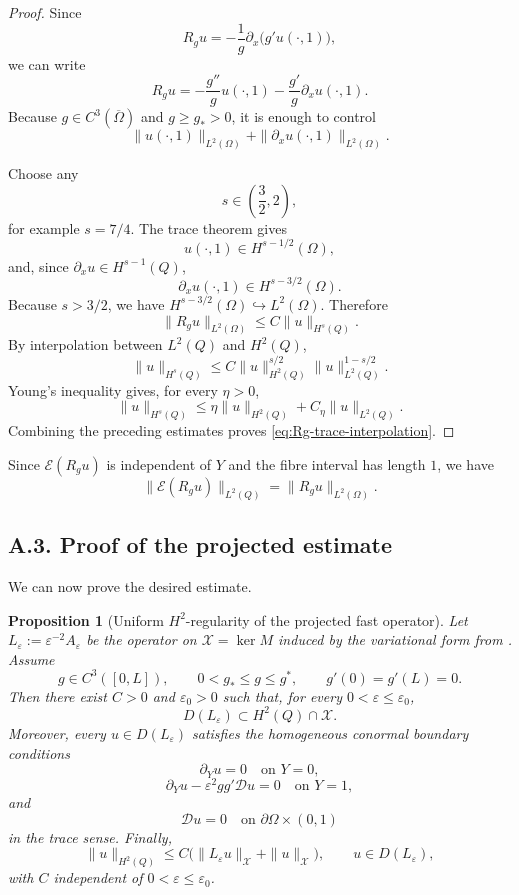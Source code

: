 \documentclass[11pt]{article}
\newtheorem{proposition}[theorem]{Proposition}
\theoremstyle{definition}
\theoremstyle{remark}
\numberwithin{equation}{section}
\begin{document}
\begin{proof}
Since
\[
R_gu
=
-\frac1g\partial_x\bigl(g'u(\cdot,1)\bigr),
\]
we can write
\[
R_gu
=
-\frac{g''}{g}u(\cdot,1)
-
\frac{g'}g\partial_xu(\cdot,1).
\]
Because \(g\in C^3(\overline\Omega)\) and \(g\ge g_*>0\), it is enough to
control
\[
\|u(\cdot,1)\|_{L^2(\Omega)}
+
\|\partial_xu(\cdot,1)\|_{L^2(\Omega)}.
\]

Choose any
\[
s\in\left(\frac32,2\right),
\]
for example \(s=7/4\). The trace theorem gives
\[
u(\cdot,1)\in H^{s-1/2}(\Omega),
\]
and, since \(\partial_xu\in H^{s-1}(Q)\),
\[
\partial_xu(\cdot,1)\in H^{s-3/2}(\Omega).
\]
Because \(s>3/2\), we have \(H^{s-3/2}(\Omega)\hookrightarrow L^2(\Omega)\).
Therefore
\[
\|R_gu\|_{L^2(\Omega)}
\le
C\|u\|_{H^s(Q)}.
\]
By interpolation between \(L^2(Q)\) and \(H^2(Q)\),
\[
\|u\|_{H^s(Q)}
\le
C
\|u\|_{H^2(Q)}^{s/2}
\|u\|_{L^2(Q)}^{1-s/2}.
\]
Young's inequality gives, for every \(\eta>0\),
\[
\|u\|_{H^s(Q)}
\le
\eta\|u\|_{H^2(Q)}
+
C_\eta\|u\|_{L^2(Q)}.
\]
Combining the preceding estimates proves
\eqref{eq:Rg-trace-interpolation}.
\end{proof}

Since \(\mathcal E(R_gu)\) is independent of \(Y\) and the fibre interval has
length \(1\), we have
\[
\|\mathcal E(R_gu)\|_{L^2(Q)}
=
\|R_gu\|_{L^2(\Omega)}.
\label{eq:E-Rg-norm}
\]

\subsection*{A.3. Proof of the projected estimate}

We can now prove the desired estimate.

\begin{proposition}[Uniform \(H^2\)-regularity of the projected fast operator]
\label{prop:uniform-H2-projected-fast-operator}
Let \(L_\varepsilon:=\varepsilon^{-2}A_\varepsilon\) be the operator on
\(\mathcal X=\ker M\) induced by the variational form from .
Assume
\[
g\in C^3([0,L]),\qquad 0<g_*\le g\le g^*,
\qquad g'(0)=g'(L)=0.
\]
Then there exist \(C>0\) and \(\varepsilon_0>0\) such that, for every
\(0<\varepsilon\le\varepsilon_0\),
\[
D(L_\varepsilon)\subset H^2(Q)\cap\mathcal X.
\]
Moreover, every \(u\in D(L_\varepsilon)\) satisfies the homogeneous conormal
boundary conditions
\[
\partial_Yu=0 \quad\text{on }Y=0,
\]
\[
\partial_Yu-\varepsilon^2gg'\mathcal D u=0
\quad\text{on }Y=1,
\]
and
\[
\mathcal D u=0
\quad\text{on }\partial\Omega\times(0,1)
\]
in the trace sense. Finally,
\[
\|u\|_{H^2(Q)}
\le
C\bigl(
\|L_\varepsilon u\|_{\mathcal X}
+
\|u\|_{\mathcal X}
\bigr),
\qquad u\in D(L_\varepsilon),
\]
with \(C\) independent of \(0<\varepsilon\le\varepsilon_0\).
\end{proposition}
\end{document}
